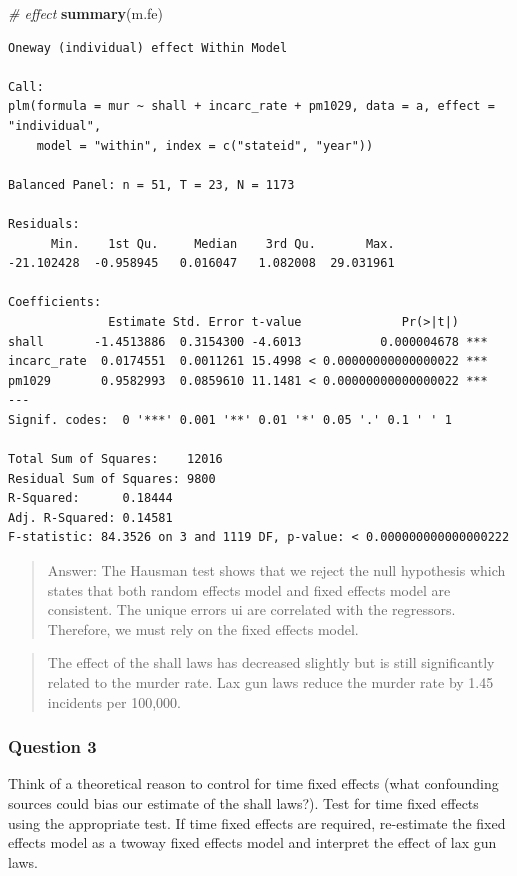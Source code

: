 \documentclass[]{article}
\newenvironment{Shaded}{\begin{snugshade}}{\end{snugshade}}
\newcommand{\KeywordTok}[1]{\textcolor[rgb]{0.13,0.29,0.53}{\textbf{#1}}}
\newcommand{\CommentTok}[1]{\textcolor[rgb]{0.56,0.35,0.01}{\textit{#1}}}
\newcommand{\NormalTok}[1]{#1}
\theoremstyle{definition}
\theoremstyle{definition}
\theoremstyle{definition}
\theoremstyle{remark}
\begin{document}
\begin{Shaded}
\begin{Highlighting}[]
\CommentTok{# effect}
\KeywordTok{summary}\NormalTok{(m.fe)}
\end{Highlighting}
\end{Shaded}

\begin{verbatim}
Oneway (individual) effect Within Model

Call:
plm(formula = mur ~ shall + incarc_rate + pm1029, data = a, effect = "individual", 
    model = "within", index = c("stateid", "year"))

Balanced Panel: n = 51, T = 23, N = 1173

Residuals:
      Min.    1st Qu.     Median    3rd Qu.       Max. 
-21.102428  -0.958945   0.016047   1.082008  29.031961 

Coefficients:
              Estimate Std. Error t-value              Pr(>|t|)    
shall       -1.4513886  0.3154300 -4.6013           0.000004678 ***
incarc_rate  0.0174551  0.0011261 15.4998 < 0.00000000000000022 ***
pm1029       0.9582993  0.0859610 11.1481 < 0.00000000000000022 ***
---
Signif. codes:  0 '***' 0.001 '**' 0.01 '*' 0.05 '.' 0.1 ' ' 1

Total Sum of Squares:    12016
Residual Sum of Squares: 9800
R-Squared:      0.18444
Adj. R-Squared: 0.14581
F-statistic: 84.3526 on 3 and 1119 DF, p-value: < 0.000000000000000222
\end{verbatim}

\begin{quote}
Answer: The Hausman test shows that we reject the null hypothesis which
states that both random effects model and fixed effects model are
consistent. The unique errors ui are correlated with the regressors.
Therefore, we must rely on the fixed effects model.
\end{quote}

\begin{quote}
The effect of the shall laws has decreased slightly but is still
significantly related to the murder rate. Lax gun laws reduce the murder
rate by 1.45 incidents per 100,000.
\end{quote}

\subsubsection{Question 3}\label{question-3-1}

Think of a theoretical reason to control for time fixed effects (what
confounding sources could bias our estimate of the shall laws?). Test
for time fixed effects using the appropriate test. If time fixed effects
are required, re-estimate the fixed effects model as a twoway fixed
effects model and interpret the effect of lax gun laws.
\end{document}
